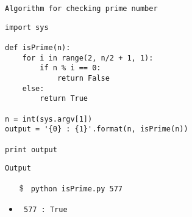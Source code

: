 \begin{center}
\texttt{Algorithm for checking prime number} 
\end{center}
\begin{verbatim}
import sys

def isPrime(n):
	for i in range(2, n/2 + 1, 1):
		if n % i == 0:
			return False
	else:
		return True

n = int(sys.argv[1])
output = '{0} : {1}'.format(n, isPrime(n))

print output

\end{verbatim}
\begin{center}
\texttt{Output}
\end{center}
\begin{itemize}
\item[\$]\texttt{ python isPrime.py 577}
\item\texttt{ 577 : True}
\end{itemize}
